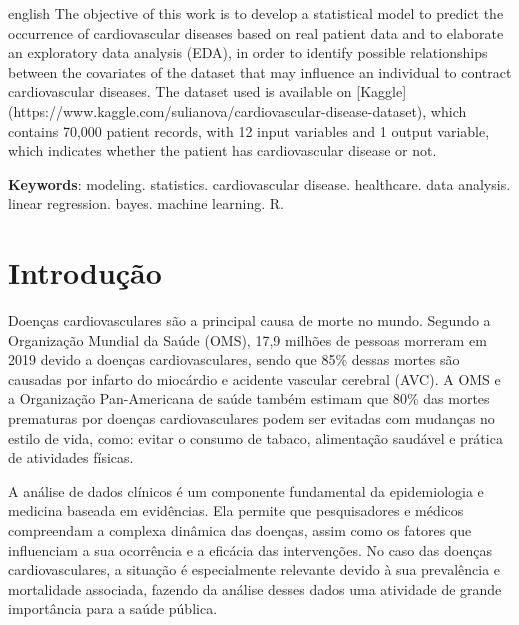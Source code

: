 \documentclass[article,11pt,a4paper,brazil]{abntex2}
\begin{document}
\newpage	
\thispagestyle{empty}
	\renewcommand{\resumoname}{Abstract}
	\begin{resumoumacoluna}
		\begin{otherlanguage*}{english}
			The objective of this work is to develop a statistical model to predict the occurrence of cardiovascular diseases based on real patient data and to elaborate an exploratory data analysis (EDA), in order to identify possible relationships between the covariates of the dataset that may influence an individual to contract cardiovascular diseases. The dataset used is available on [Kaggle](https://www.kaggle.com/sulianova/cardiovascular-disease-dataset), which contains 70,000 patient records, with 12 input variables and 1 output variable, which indicates whether the patient has cardiovascular disease or not.
			
			\vspace{\onelineskip}
			
			\noindent
			\textbf{Keywords}: modeling. statistics. cardiovascular disease. healthcare. data analysis. linear regression. bayes. machine learning. R.
		\end{otherlanguage*}  
	\end{resumoumacoluna}

	\newpage

	\thispagestyle{empty}
	\tableofcontents*
	\newpage

	\section{Introdução}
	\setcounter{page}{1}
	\pagestyle{plain}
	Doenças cardiovasculares são a principal causa de morte no mundo. Segundo a Organização Mundial da Saúde (OMS), 17,9 milhões de pessoas morreram em 2019 devido a doenças cardiovasculares, sendo que 85\% dessas mortes são causadas por infarto do miocárdio e acidente vascular cerebral (AVC). A OMS e a Organização Pan-Americana de saúde também estimam que 80\% das mortes prematuras por doenças cardiovasculares podem ser evitadas com mudanças no estilo de vida, como: evitar o consumo de tabaco, alimentação saudável e prática de atividades físicas. 
	
	A análise de dados clínicos é um componente fundamental da epidemiologia e medicina baseada em evidências. Ela permite que pesquisadores e médicos compreendam a complexa dinâmica das doenças, assim como os fatores que influenciam a sua ocorrência e a eficácia das intervenções. No caso das doenças cardiovasculares, a situação é especialmente relevante devido à sua prevalência e mortalidade associada, fazendo da análise desses dados uma atividade de grande importância para a saúde pública.
	
\end{document}
